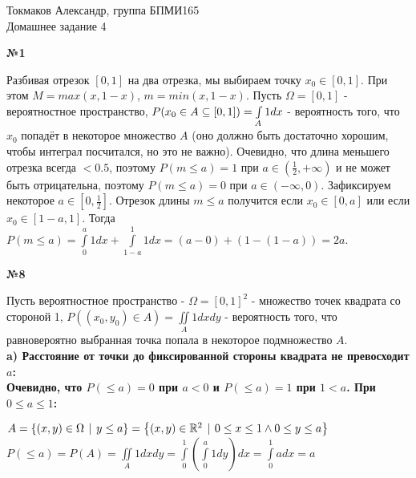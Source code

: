 \documentclass{article}
\newenvironment{task}{\begin{center}\fontsize{14}{14}\selectfont\bf}{\rm\fontsize{12}{12}\selectfont\end{center}}
\begin{document}
	\begin{center}
		Токмаков Александр, группа БПМИ165 \\
		Домашнее задание 4
	\end{center}
	
	\begin{task} 
		№1
	\end{task}
	Разбивая отрезок $[0, 1]$ на два отрезка, мы выбираем точку $x_0 \in [0, 1]$. При этом $M = max(x, 1-x)$, $m = min(x, 1-x)$. Пусть $\Omega = [0, 1]$ - вероятностное пространство, $P(x_0 \in A \subseteq [0,1]) = \int\limits \limits_{A} 1dx$ - вероятность того, что $x_0$ попадёт в некоторое множество $A$ (оно должно быть достаточно хорошим, чтобы интеграл посчитался, но это не важно). Очевидно, что длина меньшего отрезка всегда $< 0.5$, поэтому $P(m \leq a) = 1$ при $a \in (\frac{1}{2}, +\infty)$ и не может быть отрицательна, поэтому $P(m \leq a) = 0$ при $a \in (-\infty, 0)$. Зафиксируем некоторое $a \in [0, \frac{1}{2}]$. Отрезок длины $m \leq a$ получится если $x_0 \in [0, a]$ или если $x_0 \in [1-a, 1]$. Тогда
	$P(m \leq a) = \int\limits_0^a 1dx + \int\limits_{1-a}^1 1dx 
	= (a - 0) + (1 - (1-a)) = 2a$.



	\begin{task} 
		№8
	\end{task}
	Пусть вероятностное пространство - $\Omega = [0, 1]^2$ - множество точек квадрата со стороной 1, $P((x_0, y_0) \in A) = \iint\limits_{A}1dxdy$ - вероятность того, что равновероятно выбранная точка попала в некоторое подмножество $A$. \\
	
	\bf a) \rm Расстояние от точки до фиксированной стороны квадрата не превосходит $a$:\\
	Очевидно, что $P(\leq a) = 0$ при $a < 0$ и $P(\leq a)=1$ при $1<a$. При $0 \leq a \leq 1$: \\
	\begin{center}
	$A = \left\lbrace(x, y) \in \Omega \hspace{4px}|\hspace{4px} y \leq a \right\rbrace
       = \left\lbrace(x, y) \in \mathbb{R}^2 \hspace{4px}|\hspace{4px} 0\leq x \leq 1 \wedge 0 \leq y \leq a \right\rbrace$ \\
    $P(\leq a) = P(A) = \iint\limits_A1dxdy = \int\limits_0^1 \left( \int\limits_0^a 1dy \right)dx 
     = \int\limits_0^1 adx = a$

	\end{center}
\end{document}
